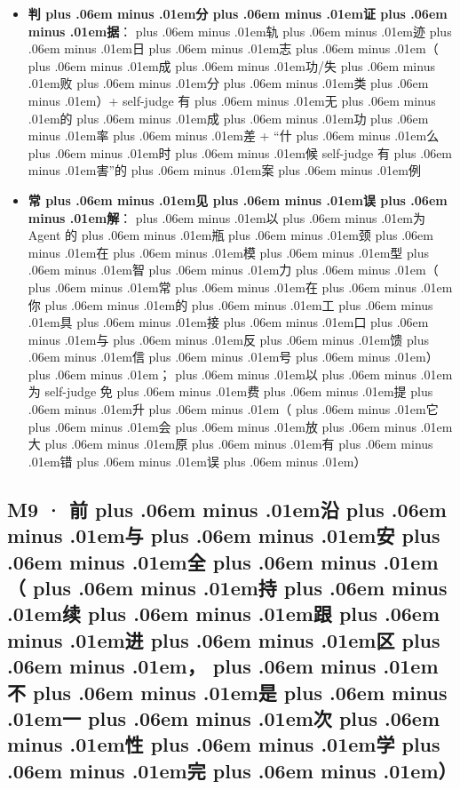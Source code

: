 \documentclass[
]{article}
\def\zh#1{{\zhfont #1}}
\def\sym#1{{\symfont #1}}
\def\zhglue{\hskip0pt plus .06em minus .01em}
\begin{document}
\begin{itemize}
\item
  \textbf{\zh{判\zhglue 分\zhglue 证\zhglue 据}}\zh{：\zhglue 轨\zhglue 迹\zhglue 日\zhglue 志\zhglue （\zhglue 成\zhglue 功}/\zh{失\zhglue 败\zhglue 分\zhglue 类\zhglue ）}+ self-judge \zh{有\zhglue 无\zhglue 的\zhglue 成\zhglue 功\zhglue 率\zhglue 差} + ``\zh{什\zhglue 么\zhglue 时\zhglue 候} self-judge \zh{有\zhglue 害}''\zh{的\zhglue 案\zhglue 例}
\item
  \textbf{\zh{常\zhglue 见\zhglue 误\zhglue 解}}\zh{：\zhglue 以\zhglue 为} Agent \zh{的\zhglue 瓶\zhglue 颈\zhglue 在\zhglue 模\zhglue 型\zhglue 智\zhglue 力\zhglue （\zhglue 常\zhglue 在\zhglue 你\zhglue 的\zhglue 工\zhglue 具\zhglue 接\zhglue 口\zhglue 与\zhglue 反\zhglue 馈\zhglue 信\zhglue 号\zhglue ）\zhglue ；\zhglue 以\zhglue 为} self-judge \zh{免\zhglue 费\zhglue 提\zhglue 升\zhglue （\zhglue 它\zhglue 会\zhglue 放\zhglue 大\zhglue 原\zhglue 有\zhglue 错\zhglue 误\zhglue ）}
\end{itemize}

\subsection{M9 \sym{·} \zh{前\zhglue 沿\zhglue 与\zhglue 安\zhglue 全\zhglue （\zhglue 持\zhglue 续\zhglue 跟\zhglue 进\zhglue 区\zhglue ，\zhglue 不\zhglue 是\zhglue 一\zhglue 次\zhglue 性\zhglue 学\zhglue 完\zhglue ）}}\label{m9-ux524dux6cbfux4e0eux5b89ux5168ux6301ux7eedux8ddfux8fdbux533aux4e0dux662fux4e00ux6b21ux6027ux5b66ux5b8c}
\end{document}
